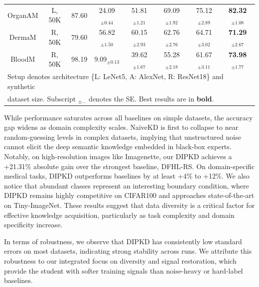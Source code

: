 \begin{table}[ht]
\begin{tabular}{c|c|c|c|c|c|c|c}
        OrganAM  & L, 50K  & 87.60 & 24.09$_{\pm 0.44}$           & 51.81$_{\pm 1.21}$           & 69.09$_{\pm 1.92}$ & 75.12$_{\pm 2.89}$          & \textbf{82.32}$_{\pm 1.08}$ \\
        DermaM   & R, 50K  & 79.60 & 56.82$_{\pm 1.50}$           & 60.15$_{\pm 2.93}$           & 62.76$_{\pm 2.76}$ & 64.71$_{\pm 3.02}$          & \textbf{71.29}$_{\pm 2.67}$ \\
        BloodM   & R, 50K  & 98.19 & \phantom{0}9.09$_{\pm 0.13}$ & 39.62$_{\pm 1.67}$           & 55.28$_{\pm 2.18}$ & 61.67$_{\pm 3.11}$          & \textbf{73.98}$_{\pm 1.77}$ \\
        \hline
        \multicolumn{8}{l}{Setup denotes architecture \{L: LeNet5, A: AlexNet, R: ResNet18\} and synthetic} \\
        \multicolumn{8}{l}{dataset size. Subscript $_{\pm \ldots}$ denotes the SE. Best results are in \textbf{bold}.} \\
    \end{tabular}
    \label{ch4:tab:standard-all}
\end{table}

\begin{foldable}
    While performance saturates across all baselines on simple datasets, the accuracy gap widens as domain complexity scales.
    NaiveKD is first to collapse to near random-guessing levels in complex datasets, implying that unstructured noise cannot elicit the deep semantic knowledge embedded in black-box experts.
    Notably, on high-resolution images like Imagenette, our DIPKD achieves a +21.31\% absolute gain over the strongest baseline, DFHL-RS.
    On domain-specific medical tasks, DIPKD outperforms baselines by at least +4\% to +12\%.
    We also notice that abundant classes represent an interesting boundary condition, where DIPKD remains highly competitive on CIFAR100 and approaches state-of-the-art on Tiny-ImageNet.
    These results suggest that data diversity is a critical factor for effective knowledge acquisition, particularly as task complexity and domain specificity increase.
\end{foldable}

\begin{foldable}
    In terms of robustness, we observe that DIPKD has consistently low standard errors on most datasets, indicating strong stability across runs.
    We attribute this robustness to our integrated focus on diversity and signal restoration, which provide the student with softer training signals than noise-heavy or hard-label baselines.
\end{foldable}


